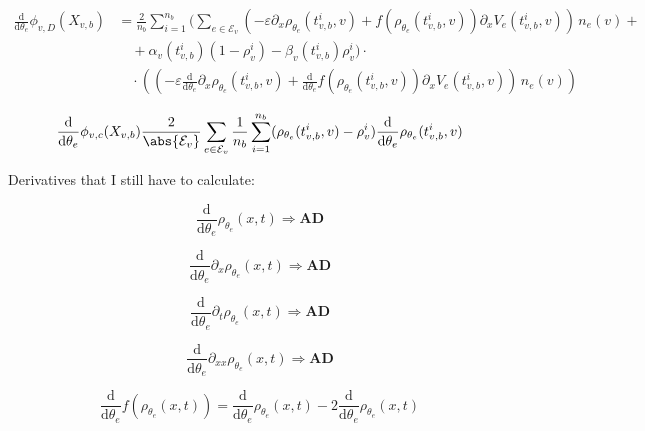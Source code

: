 \begin{align*}
    \frac{\mathrm{d}}{\mathrm{d} \theta_e} \phi_{v,D} (X_{v,b}) & = \frac{2}{n_b} \sum_{i=1}^{n_b} ( \sum_{e\in \mathcal{E}_v} (-\varepsilon \partial_x \rho_{\theta_e} (t_{v,b}^i, v) + f(\rho_{\theta_e} (t_{v,b}^i, v)) \partial_x V_e(t_{v,b}^i, v)) \, n_e (v) + \\ 
    & \quad + \alpha_v(t_{v,b}^i) (1-\rho_v^i) - \beta_v(t_{v,b}^i) \rho_v^i )  \cdot \\
    & \quad \cdot ((-\varepsilon \frac{\mathrm{d}}{\mathrm{d} \theta_e} \partial_x \rho_{\theta_e} (t_{v,b}^i, v) + \frac{\mathrm{d}}{\mathrm{d} \theta_e} f(\rho_{\theta_e} (t_{v,b}^i, v)) \partial_x V_e(t_{v,b}^i, v)) \, n_e (v))
\end{align*}

\begin{equation*}
    \frac{\mathrm{d}}{\mathrm{d} \theta_e} \phi_{v,c} (X_{v,b}) \frac{2}{\abs{\mathcal{E}_v}} \sum_{e \in \mathcal{E}_v} \frac{1}{n_b} \sum_{i=1}^{n_b} ( \rho_{\theta_e} (t_{v,b}^i, v) - \rho_{v}^i) \frac{\mathrm{d}}{\mathrm{d} \theta_e} \rho_{\theta_e} (t_{v,b}^i, v)
\end{equation*}

Derivatives that I still have to calculate:

\begin{equation*}
    \frac{\mathrm{d}}{\mathrm{d} \theta_e} \rho_{\theta_e}(x, t) \Rightarrow \textbf{AD}
\end{equation*}

\begin{equation*}
    \frac{\mathrm{d}}{\mathrm{d} \theta_e} \partial_x \rho_{\theta_e}(x, t) \Rightarrow \textbf{AD}
\end{equation*}

\begin{equation*}
    \frac{\mathrm{d}}{\mathrm{d} \theta_e} \partial_t \rho_{\theta_e}(x, t) \Rightarrow \textbf{AD}
\end{equation*}

\begin{equation*}
    \frac{\mathrm{d}}{\mathrm{d} \theta_e} \partial_{xx} \rho_{\theta_e}(x, t) \Rightarrow \textbf{AD}
\end{equation*}

\begin{equation*}
    \frac{\mathrm{d}}{\mathrm{d} \theta_e} f(\rho_{\theta_e}(x, t)) = \frac{\mathrm{d}}{\mathrm{d} \theta_e} \rho_{\theta_e}(x, t) - 2 \frac{\mathrm{d}}{\mathrm{d} \theta_e} \rho_{\theta_e}(x, t)
\end{equation*}

